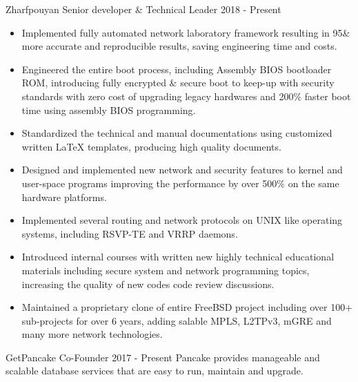 \documentclass[12pt]{developercv}
\begin{document}
\begin{entrylist}
	\entry
		{Zharfpouyan}
		{Senior developer \& Technical Leader}
		{2018 - Present}
		{
			\begin{itemize}
				\itemsep0em
				\item Implemented fully automated network laboratory framework resulting in 95\&
				more accurate and reproducible results, saving engineering time and costs.
				\item Engineered the entire boot process, including Assembly BIOS bootloader ROM, introducing fully encrypted \& secure
				boot to keep-up with security standards with zero cost of upgrading legacy hardwares and
				200\% faster boot time using assembly BIOS programming.
				\item Standardized the technical and manual documentations using customized written \LaTeX
				templates, producing high quality documents.
				\item Designed and implemented new network and security features to kernel and user-space
				programs improving the performance by over 500\% on the same hardware platforms.
				\item Implemented several routing and network protocols on UNIX like operating systems,
				including RSVP-TE and VRRP daemons.
				\item Introduced internal courses with written new highly technical educational materials including
				secure system and network programming topics, increasing the quality of
				new codes code review discussions.
				\item Maintained a proprietary clone of entire FreeBSD project including over 100+ sub-projects
				for over 6 years, adding
				salable MPLS, L2TPv3, mGRE and many more network technologies.
			\end{itemize}

		\begin{itemize}
		\end{itemize}
		}
	\entry
		{GetPancake}
		{Co-Founder}
		{2017 - Present}
		{
			Pancake provides manageable and scalable database services that
			are easy to run, maintain and upgrade.\\

}
\end{entrylist}
\end{document}
